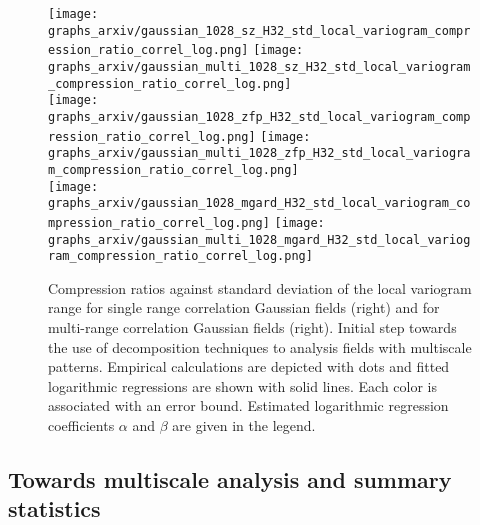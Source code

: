\documentclass[conference]{IEEEtran}
\begin{document}
\begin{figure}
\centering
\texttt{[image: graphs\_arxiv/gaussian\_1028\_sz\_H32\_std\_local\_variogram\_compression\_ratio\_correl\_log.png]} \hspace{-10pt} 
\texttt{[image: graphs\_arxiv/gaussian\_multi\_1028\_sz\_H32\_std\_local\_variogram\_compression\_ratio\_correl\_log.png]} \\ 
\texttt{[image: graphs\_arxiv/gaussian\_1028\_zfp\_H32\_std\_local\_variogram\_compression\_ratio\_correl\_log.png]} \hspace{-10pt} 
\texttt{[image: graphs\_arxiv/gaussian\_multi\_1028\_zfp\_H32\_std\_local\_variogram\_compression\_ratio\_correl\_log.png]} \\ 
\texttt{[image: graphs\_arxiv/gaussian\_1028\_mgard\_H32\_std\_local\_variogram\_compression\_ratio\_correl\_log.png]} \hspace{-10pt} 
\texttt{[image: graphs\_arxiv/gaussian\_multi\_1028\_mgard\_H32\_std\_local\_variogram\_compression\_ratio\_correl\_log.png]}
\vspace{-10pt}
\caption{Compression ratios against standard deviation of the local variogram range  for single range  correlation Gaussian fields (right) and for multi-range correlation Gaussian fields (right). 
Initial step towards the use of decomposition techniques to analysis fields with multiscale patterns. 
Empirical calculations are depicted with dots and fitted logarithmic regressions are shown with solid lines. Each color is associated with an error bound. 
Estimated logarithmic regression coefficients $\alpha$ and $\beta$ are given in the legend. }
\vspace{-15pt}
\label{fig:results_localvariog_gaussian}
\end{figure}
%


\subsection{Towards multiscale analysis and summary statistics}
\end{document}
